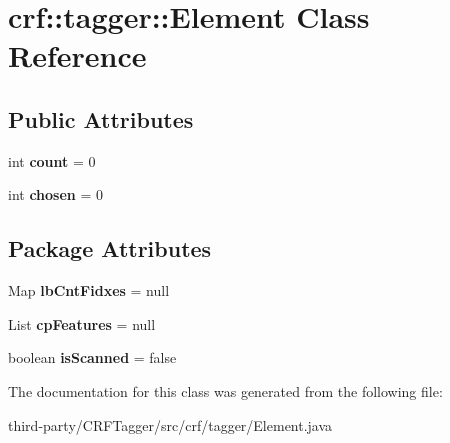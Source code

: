 \hypertarget{classcrf_1_1tagger_1_1Element}{
\section{crf::tagger::Element Class Reference}
\label{classcrf_1_1tagger_1_1Element}
}
\subsection*{Public Attributes}
\begin{DoxyCompactItemize}
\item 
\hypertarget{classcrf_1_1tagger_1_1Element_a8fd18a0ef1ec990d8a46e6fc9f8ac2fb}{
int {\bfseries count} = 0}
\label{classcrf_1_1tagger_1_1Element_a8fd18a0ef1ec990d8a46e6fc9f8ac2fb}

\item 
\hypertarget{classcrf_1_1tagger_1_1Element_ab5480d3bf2962fe2310bd27abea0a4b3}{
int {\bfseries chosen} = 0}
\label{classcrf_1_1tagger_1_1Element_ab5480d3bf2962fe2310bd27abea0a4b3}

\end{DoxyCompactItemize}
\subsection*{Package Attributes}
\begin{DoxyCompactItemize}
\item 
\hypertarget{classcrf_1_1tagger_1_1Element_a256c2371e4960831efb52d4f306ef9b4}{
Map {\bfseries lbCntFidxes} = null}
\label{classcrf_1_1tagger_1_1Element_a256c2371e4960831efb52d4f306ef9b4}

\item 
\hypertarget{classcrf_1_1tagger_1_1Element_a49f65ea3cf34a078ebef63ca14f3e775}{
List {\bfseries cpFeatures} = null}
\label{classcrf_1_1tagger_1_1Element_a49f65ea3cf34a078ebef63ca14f3e775}

\item 
\hypertarget{classcrf_1_1tagger_1_1Element_a4ec6a7ac5ee139e285dd27dd3acc40ed}{
boolean {\bfseries isScanned} = false}
\label{classcrf_1_1tagger_1_1Element_a4ec6a7ac5ee139e285dd27dd3acc40ed}

\end{DoxyCompactItemize}


The documentation for this class was generated from the following file:\begin{DoxyCompactItemize}
\item 
third-\/party/CRFTagger/src/crf/tagger/Element.java\end{DoxyCompactItemize}
